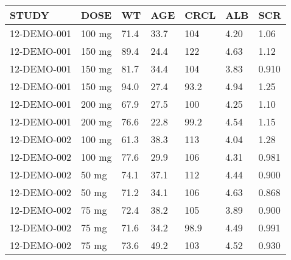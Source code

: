 {\def\arraystretch{1.4}\tabcolsep=5pt
\begin{threeparttable}
\begin{tabular}[h]{lllllll}
\hline
STUDY & DOSE & WT & AGE & CRCL & ALB & SCR \\
\hline
12-DEMO-001 & 100 mg & 71.4 & 33.7 & 104 & 4.20 & 1.06 \\ \hline
12-DEMO-001 & 150 mg & 89.4 & 24.4 & 122 & 4.63 & 1.12 \\
12-DEMO-001 & 150 mg & 81.7 & 34.4 & 104 & 3.83 & 0.910 \\ \hline
12-DEMO-001 & 150 mg & 94.0 & 27.4 & 93.2 & 4.94 & 1.25 \\
12-DEMO-001 & 200 mg & 67.9 & 27.5 & 100 & 4.25 & 1.10 \\ \hline
12-DEMO-001 & 200 mg & 76.6 & 22.8 & 99.2 & 4.54 & 1.15 \\
12-DEMO-002 & 100 mg & 61.3 & 38.3 & 113 & 4.04 & 1.28 \\
12-DEMO-002 & 100 mg & 77.6 & 29.9 & 106 & 4.31 & 0.981 \\
12-DEMO-002 & 50 mg & 74.1 & 37.1 & 112 & 4.44 & 0.900 \\
12-DEMO-002 & 50 mg & 71.2 & 34.1 & 106 & 4.63 & 0.868 \\
12-DEMO-002 & 75 mg & 72.4 & 38.2 & 105 & 3.89 & 0.900 \\
12-DEMO-002 & 75 mg & 71.6 & 34.2 & 98.9 & 4.49 & 0.991 \\
12-DEMO-002 & 75 mg & 73.6 & 49.2 & 103 & 4.52 & 0.930 \\
\hline
\end{tabular}
\end{threeparttable}
}
